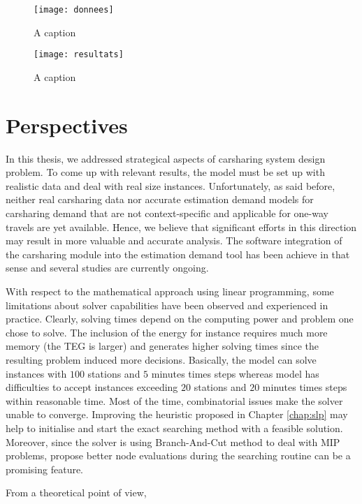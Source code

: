 \begin{figure}[t]
\texttt{[image: donnees]}
\caption{A caption}
\label{fig:donnees}
\end{figure}


\begin{figure}[t]
\texttt{[image: resultats]}
\caption{A caption}
\label{fig:resultats}
\end{figure}


\section{Perspectives}
In this thesis, we addressed strategical aspects of carsharing system design problem.
To come up with relevant results, the model must be set up with realistic data and deal with real size instances.
Unfortunately, as said before, neither real carsharing data nor accurate estimation demand models for carsharing demand that are not context-specific and applicable for one-way travels are yet available.
Hence, we believe that significant efforts in this direction may result in more valuable and accurate analysis.
The software integration of the carsharing module into the estimation demand tool has been achieve in that sense and several studies are currently ongoing.

\medskip
With respect to the mathematical approach using linear programming, some limitations about solver capabilities have been observed and experienced in practice.
Clearly, solving times depend on the computing power and problem one chose to solve.
The inclusion of the energy for instance requires much more memory (the TEG is larger) and generates higher solving times since the resulting problem induced more decisions.
Basically, the {\SDP} model can solve instances with $100$ stations and $5$ minutes times steps whereas {\ENERGY} model has difficulties to accept instances exceeding $20$ stations and $20$ minutes times steps within reasonable time.
Most of the time, combinatorial issues make the solver unable to converge.
Improving the heuristic proposed in Chapter \ref{chap:slp} may help to initialise and start the exact searching method with a feasible solution.
Moreover, since the solver is using Branch-And-Cut method to deal with MIP problems, propose better node evaluations during the searching routine can be a promising feature.

\medskip
From a theoretical point of view, 

% 





